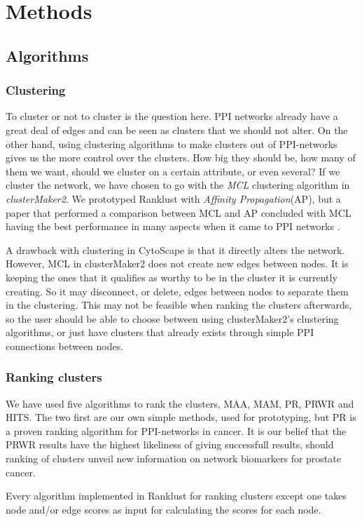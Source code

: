 \part{Methods}
\label{pa:methods}
\chapter{Algorithms}
\section{Clustering}
To cluster or not to cluster is the question here. PPI networks already have
a great deal of edges and can be seen as clusters that we should not alter. On
the other hand, using clustering algorithms to make clusters out of
PPI-networks gives us the more control over the clusters. How big they should
be, how many of them we want, should we cluster on a certain attribute, or even
several? If we cluster the network, we have chosen to go with the \textit{MCL}
clustering algorithm in \textit{clusterMaker2}. We prototyped Ranklust with
\textit{Affinity Propagation}(AP), but a paper that performed a comparison
between MCL and AP concluded with MCL having the best performance in many
aspects when it came to PPI networks \cite{ap-vs-mcl}.

A drawback with clustering in CytoScape is that it directly alters the network.
However, MCL in clusterMaker2 does not create new edges between nodes. It is
keeping the ones that it qualifies as worthy to be in the cluster it is
currently creating. So it may disconnect, or delete, edges between nodes to
separate them in the clustering. This may not be feasible when ranking the
clusters afterwards, so the user should be able to choose between using
clusterMaker2's clustering algorithms, or just have clusters that already exists
through simple PPI connections between nodes.

\section{Ranking clusters}
We have used five algorithms to rank the clusters, MAA, MAM, PR, PRWR and HITS.
The two first are our own simple methods, used for prototyping, but PR is a
proven ranking algorithm for PPI-networks in cancer. It is our belief that the
PRWR results have the highest likeliness of giving successfull results, should
ranking of clusters unveil new information on network biomarkers for prostate
cancer.

Every algorithm implemented in Ranklust for ranking clusters except one takes
node and/or edge scores as input for calculating the scores for each node.

